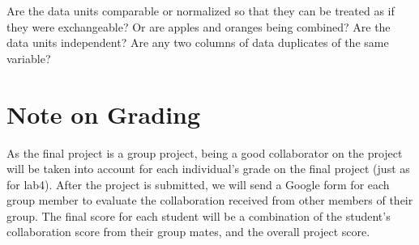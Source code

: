 \documentclass[letterpaper,12pt]{article}
\begin{document}
Are the data units comparable or normalized so that they can be treated as if they were exchangeable? Or are apples and oranges being combined? Are the data units independent? Are any two columns of data duplicates of the same variable?

\section{Note on Grading}

As the final project is a group project, being a good collaborator on the project will be taken into account for each individual’s grade on the final project (just as for lab4). After the project is submitted, we will send a Google form for each group member to evaluate the collaboration received from other members of their group. The final score for each student will be a combination of the student’s collaboration score from their group mates, and the overall project score.
\end{document}

